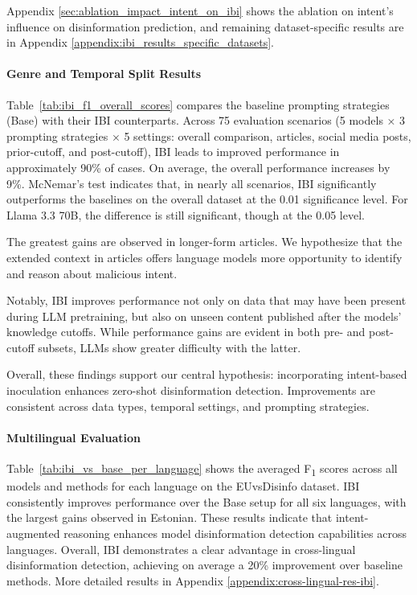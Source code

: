 \documentclass[11pt]{article}
\begin{document}
Appendix \ref{sec:ablation_impact_intent_on_ibi} shows the ablation on intent’s influence on disinformation prediction, and remaining dataset-specific results are in Appendix \ref{appendix:ibi_results_specific_datasets}.


\paragraph{Genre and Temporal Split Results} 
Table~\ref{tab:ibi_f1_overall_scores} compares the baseline prompting strategies (Base) with their IBI counterparts. Across 75 evaluation scenarios (5 models × 3 prompting strategies × 5 settings: overall comparison, articles, social media posts, prior-cutoff, and post-cutoff), IBI leads to improved performance in approximately 90\% of cases. On average, the overall performance increases by 9\%. McNemar’s test indicates that, in nearly all scenarios, IBI significantly outperforms the baselines on the overall dataset at the 0.01 significance level. For Llama 3.3 70B, the difference is still significant, though at the 0.05 level.

The greatest gains are observed in longer-form articles. We hypothesize that the extended context in articles offers language models more opportunity to identify and reason about malicious intent.

Notably, IBI improves performance not only on data that may have been present during LLM pretraining, but also on unseen content published after the models' knowledge cutoffs. While performance gains are evident in both pre- and post-cutoff subsets, LLMs show greater difficulty with the latter.

Overall, these findings support our central hypothesis: incorporating intent-based inoculation enhances zero-shot disinformation detection. Improvements are consistent across data types, temporal settings, and prompting strategies.



\paragraph{Multilingual Evaluation}

Table~\ref{tab:ibi_vs_base_per_language} shows the averaged F\textsubscript{1} scores across all models and methods for each language on the EUvsDisinfo dataset. IBI consistently improves performance over the Base setup for all six languages, with the largest gains observed in Estonian. These results indicate that intent-augmented reasoning enhances model disinformation detection capabilities across languages. Overall, IBI demonstrates a clear advantage in cross-lingual disinformation detection, achieving on average a 20\% improvement over baseline methods. More detailed results in Appendix \ref{appendix:cross-lingual-res-ibi}.
\end{document}

